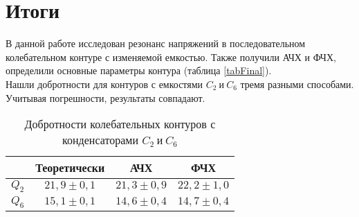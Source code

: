 \documentclass{lab}
\begin{document}
\vspace{-0.1cm}

\section*{Итоги}

\vspace{-0.1cm}

В данной работе исследован резонанс напряжений в последовательном колебательном контуре
с изменяемой емкостью. Также получили АЧХ и ФЧХ, определили основные параметры контура
(таблица \ref{tabFinal}).\\
Нашли добротности для контуров с емкостями $ C_2 \ и \ C_6 $ тремя разными способами.
Учитывая погрешности, результаты совпадают.

\begin{table}[H]
	\centering
	\begin{tabular}{|c|c|c|c|}
		\hline
				& Теоретически		& АЧХ				& ФЧХ 				\\ \hline
		$ Q_2 $	& $ 21,9 \pm 0,1 $	& $ 21,3 \pm 0,9 $	& $ 22,2 \pm 1,0 $	\\
		$ Q_6 $	& $ 15,1 \pm 0,1 $	& $ 14,6 \pm 0,4 $	& $ 14,7 \pm 0,4 $	\\ \hline
	\end{tabular}
	\caption{\footnotesize 
	Добротности колебательных контуров с конденсаторами $ C_2 \ и \ C_6 $
	}
	\label{result}
\end{table}
\end{document}
